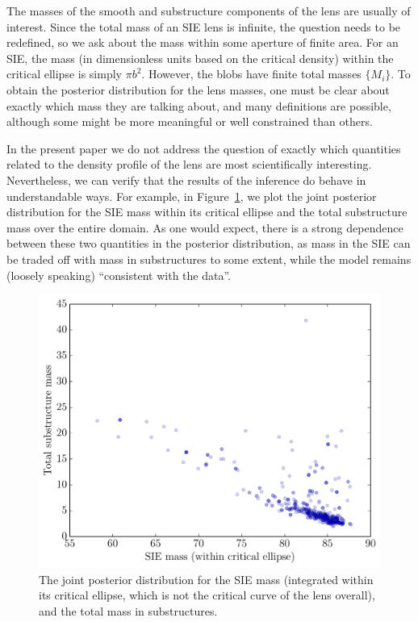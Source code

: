 \documentclass[useAMS,usenatbib]{mn2e}
\begin{document}
The masses of the smooth and substructure components of the lens are usually
of interest. Since the total mass of an SIE lens is infinite, the question
needs to be redefined, so we ask about the mass within some aperture of finite
area. For an SIE, the mass (in dimensionless units based on the critical density)
within the critical
ellipse is simply $\pi b^2$. However, the blobs have finite total masses
$\{M_i\}$. To obtain the posterior distribution for the lens masses, one must
be clear about exactly which mass they are talking about, and many definitions
are possible, although some might be more meaningful or well constrained than
others.

In the present paper we do not address the question of exactly which quantities
related to the
density profile of the lens are most scientifically interesting. Nevertheless,
we can verify that the results of the inference do behave in understandable
ways. For example, in Figure~\ref{fig:masses},
we plot the joint posterior distribution
for the SIE mass within its critical ellipse and the total substructure mass
over the entire domain. As one would expect, there is a strong dependence
between these two quantities in the posterior distribution, as mass in the
SIE can be traded off with mass in substructures to some extent, while
the model remains (loosely speaking) ``consistent with the data''.
\begin{figure}
\begin{center}
\includegraphics[scale=0.4]{masses.pdf}
\caption{The joint posterior distribution for the SIE mass (integrated within
its critical ellipse, which is not the critical curve of the lens overall),
and the total mass in substructures.\label{fig:masses}}
\end{center}
\end{figure}
\end{document}
